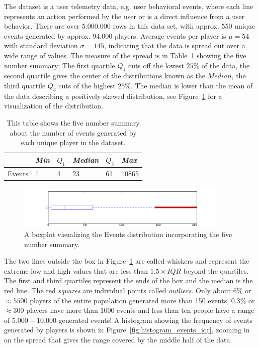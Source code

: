 The dataset is a user telemetry data, e.g. user behavioral events, where each line represents an action performed by the user or is a direct influence from a user behavior. There are over $5.000.000$ rows in this data set, with approx. $550$ unique events generated by approx. $94.000$ players. Average events per player is $\mu = 54$ with standard deviation $\sigma = 145$, indicating that the data is spread out over a wide range of values. The measure of the spread is in Table~\ref{tab:FiveSummaryEvents} showing the five number summary; The first quartile $Q_1$ cuts off the lowest $25\%$ of the data, the second quartile gives the center of the distributions known as the $Median$, the third quartile $Q_3$ cuts of the highest $25\%$. The median is lower than the mean of the data describing a positively skewed distribution, see Figure~\ref{fig:boxplot_events} for a visualization of the distribution.

\begin{table}[h]
\centering
\begin{tabular}{| l | l | l | l | l | l |}
    \hline
    & \textit{Min} & $Q_1$ & \textit{Median} & $Q_3$ & \textit{Max} \\ \hline
    Events & 1 & 4 & 23 & 61 & 10865 \\ \hline
\end{tabular}
\caption{This table shows the five number summary about the number of events generated by each unique player in the dataset.}
\label{tab:FiveSummaryEvents}
\end{table}


\begin{figure}[here]
\centerline{\includegraphics[width=0.9\textwidth]{Figures/boxplot_events.pdf}}
\caption{A boxplot visualizing the Events distribution incorporating the five number summary.}
\label{fig:boxplot_events}
\end{figure}

The two lines outside the box in Figure~\ref{fig:boxplot_events} are called whiskers and represent the extreme low and high values that are less than $1.5 \times IQR$ beyond the quartiles. The first and third quartiles represent the ends of the box and the median is the red line. The red \textit{squares} are individual points called \textit{outliers}. Only about $6\%$ or $\approx 5500$ players of the entire population generated more than 150 events, $0.3\%$ or $\approx300$ players have more than 1000 events and less than ten people have a range of $5.000-10.000$ generated events! A histogram showing the frequency of events generated by players is shown in Figure~\ref{fig:histogram_events_iqr}, zooming in on the spread that gives the range covered by the middle half of the data.

